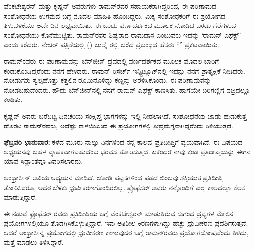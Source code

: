ವೆಂಕಟೇಶ್ವರನ್ ಮತ್ತು ಕೃಷ್ಣನ್ ಅವರುಗಳು ರಾಮನ್‍ರವರ ಸಹಾಯಕರಾಗಿದ್ದರಿಂದ, ಈ ಪರಿಣಾಮದ ಸಂಶೋಧನೆಯ ಉಗಮದ ಬಗ್ಗೆ ಮೊದಲ ಮಾಹಿತಿ ಹೊಂದಿದ್ದರು. ಮಿಕ್ಕ ಸಂಶೋಧಕರಿಗೆ ಈ ಪ್ರಯೋಗದ ತಿಳುವಳಿಕೆಯು ಅದೇ ದಿನ ಲಭ್ಯವಾಯಿತು. ಈ ಒಂದು ವರ್ಣದರ್ಶಕದ ಮೂಲಕ ನೋಡಿದ ಎರಡು ಗೆರೆಗಳಿಂದ ಸಂಶೋಧನೆಯು ಕೊನೆಮುಟ್ಟಿತು. ರಾಮನ್‍ರವರ ಶಿಷ್ಯರಾದ ರಾಮದಾಸ ಎಂಬುವರು ಇದನ್ನು ‘ರಾಮನ್ ಎಫೆಕ್ಟ್’ ಎಂದು ಕರೆದರು. ನೇಚರ್ ಪತ್ರಿಕೆಯಲ್ಲಿ () ಜುಲೈ ರಲ್ಲಿ ಬರೆದ ಪ್ರಬಂಧದ ಹೆಸರು “\textit{}” ಪ್ರಕಟವಾಯಿತು. 

ರಾಮನ್‍ರವರು ಈ ಪರಿಣಾಮವನ್ನು ಬೆನ್‍ಜೀನ್ ದ್ರವದಲ್ಲಿ ವರ್ಣದರ್ಶಕದ ಮೂಲಕ ಮೊದಲ ಬಾರಿಗೆ ಕಂಡುಕೊಂಡಿದ್ದರೆಂದು ನನಗೆ ಹೇಳಿದರು. ರಾಮನ್ ರಿಸರ್ಚ್ ಇನ್ಸ್ಟಿಟ್ಯೂಟ್‍ನಲ್ಲಿ ಇದನ್ನು ನನಗೆ ಪ್ರಾತ್ಯಕ್ಷಿಕೆ ನೀಡಿದರು. ನೋಡುಗರು ಸ್ವಲ್ಪಹೊತ್ತು ಕತ್ತಲಿನ ರೂಮಿನೊಳಿದ್ದು ಕಣ್ಣನ್ನು ಅರಳಿಸಿಕೊಂಡು, ಈ ಪರಿಣಾಮವನ್ನು ನೋಡಬಹುದೆಂದರು. ಹೌದು ಬೆನ್‍ಜೀನ್‍ನಲ್ಲಿ ನನಗೆ ರಾಮನ್ ಎಫೆಕ್ಟ್ ಕಾಣಿಸಿತು. ಹಾಗೆಯೇ ಬರಿಗಣ್ಣಿಗೆ ವಜ್ರದಲ್ಲೂ ಕಂಡಿತು.

ಕೃಷ್ಣನ್ ಅವರು ಬರೆದಿಟ್ಟ ದಿನಚರಿಯ ಸಂಕ್ಷಿಪ್ತ ಭಾಗಗಳನ್ನು ಇಲ್ಲಿ ನೀಡಲಾಗಿದೆ. ಸಂಶೋಧನೆಯ ಜಾಡು ಹುಡುಕುತ್ತ ಹೊರಟ ರಾಮನ್‍ರವರು, ಅದೆಷ್ಟು ಕಾಳಜಿಯಿಂದ ಈ ಪ್ರಯೋಗಗಳಲ್ಲಿ ತೀವ್ರಮಗ್ನರಾಗಿದ್ದರೆಂದು ತಿಳಿಯುತ್ತದೆ.

\textbf{ಫೆಬ್ರವರಿ  ಭಾನುವಾರ:} ಕಳೆದ ಮೂರು ನಾಲ್ಕು ದಿನಗಳಿಂದ ನನ್ನ ಕಾಲವು ಪ್ರತಿದೀಪ್ತಿಗೆ ವ್ಯಯವಾಗಿದೆ. ಈ ವಿಷಯದ ಅಧ್ಯಯನವು ಬಹಳ ವ್ಯಾಪಕವಾಗಬಹುದೆಂಬ ಭರವಸೆ ತೋರಿಸುತ್ತಿದೆ. ಏಕೆಂದರೆ ನಾವು ಕಂಡ ಪ್ರತಿದೀಪ್ತಿಯನ್ನು ಈಗಿನ ಯಾವ ಸಿದ್ಧಾಂತವೂ ವಿವರಿಸಲಾರದು.

ಅಂಥ್ರಾಸೀನ್ ಆವಿಯ ಅಧ್ಯಯನ ಮಾಡಿದೆ. ಜೋಡಿ ಪಟ್ಟಕಗಳಿಂದ ಪಡೆದ ಬಿಂಬವು ಶಕ್ತಿಯುತ ಪ್ರತಿದೀಪ್ತಿ ತೋರಿಸಿದರೂ, ಅದರ ಬೆಳಕು ಧ್ರುವೀಕರಣಗೊಂಡಿರಲಿಲ್ಲ. ಪ್ರೊಫೆಸರ್ ಅವರು ನನ್ನೊಂದಿಗೆ ಎಲ್ಲ ಕಾಲದಲ್ಲೂ ಕೆಲಸ ಮಾಡುತ್ತಿದ್ದಾರೆ.

ಈ ನಡುವೆ ಫ್ರೊಫೆಸರ್ ರವರು ಪ್ರತಿದೀಪ್ತಿಯ ಬಗ್ಗೆ ವೆಂಕಟೇಶ್ವರನ್ ಮಾಡುತ್ತಿರುವ ಸುಗಂಧ ದ್ರವ್ಯಗಳ ಮೇಲಿನ ಪ್ರಯೋಗಗಳಲ್ಲಿಯೂ ತೊಡಗಿಸಿಕೊಳ್ಳುತ್ತಿದ್ದಾರೆ. ಇವು ಅತಿನೀಲ ಕಿರಣಗಳಾಗಿದ್ದು ಹೆಚ್ಚು ಧ್ರುವೀಕರಣ ಪ್ರದರ್ಶಿಸುತ್ತವೆ. ಆದರೆ ಅಂಥ್ರಾಸೀನ್ನ ಪ್ರಯೋಗದಲ್ಲಿ ಧ್ರುವೀಕರಣ ಕಾಣುವುದರ ಬಗ್ಗೆ ರಾಮನ್‍ರವರು ಪ್ರಯೋಗದೋಷವೆಂದು ತಿಳಿದು, ಮತ್ತೆ ಮಾಡಲು ತಿಳಿಸಿದ್ದಾರೆ.

